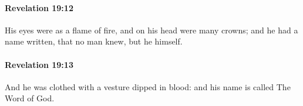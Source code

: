 		\paragraph{Revelation 19:12} %
			\label{REVELATIONNT-19-12}

			His eyes were as a flame of fire, and on his head were many crowns; and he had a name written, that no man knew, but he himself.

			\begin{framed}
			\scriptsize
				\begin{compactdesc}
					\item[SBLG] 
				\end{compactdesc}
			\end{framed}

		\paragraph{Revelation 19:13} %
			\label{REVELATIONNT-19-13}

			And he was clothed with a vesture dipped in blood: and his name is called The Word of God.


